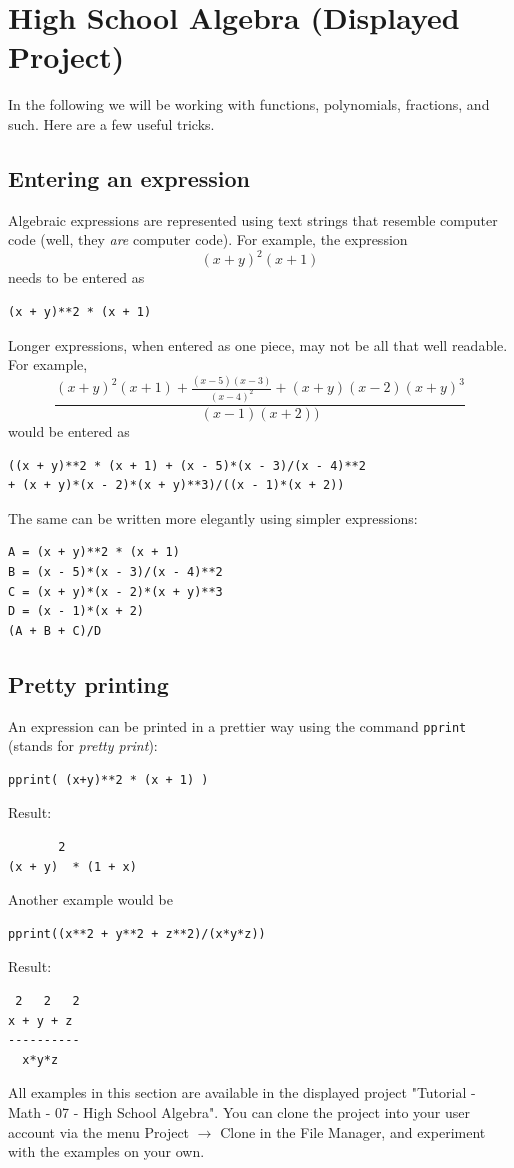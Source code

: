\documentclass[article,A4,12pt]{llncs}
\begin{document}

\section{High School Algebra (Displayed Project)}\label{algebra}

In the following we will be working with functions, polynomials, fractions, and such.
Here are a few useful tricks.

\subsection{Entering an expression}
Algebraic expressions are represented using text strings that resemble 
computer code (well, they {\em are} computer code). For example, the expression 
$$
  (x + y)^2 (x + 1)
$$ 
needs to be entered as
\begin{verbatim}
(x + y)**2 * (x + 1)
\end{verbatim}
Longer expressions, when entered as one piece, may not be all that well readable. For example,
$$
\frac{(x + y)^2 (x + 1) + \frac{(x-5)(x-3)}{(x-4)^2} + (x + y)(x - 2)(x + y)^3}{(x-1)(x+2))}
$$ 
would be entered as 
\begin{verbatim}
((x + y)**2 * (x + 1) + (x - 5)*(x - 3)/(x - 4)**2 
+ (x + y)*(x - 2)*(x + y)**3)/((x - 1)*(x + 2))
\end{verbatim}
The same can be written more elegantly using simpler expressions:
\begin{verbatim}
A = (x + y)**2 * (x + 1)
B = (x - 5)*(x - 3)/(x - 4)**2
C = (x + y)*(x - 2)*(x + y)**3
D = (x - 1)*(x + 2)
(A + B + C)/D
\end{verbatim}

\subsection{Pretty printing}
An expression can be printed in a prettier way using the command {\tt pprint} (stands for {\em pretty print}):
\begin{verbatim}
pprint( (x+y)**2 * (x + 1) )
\end{verbatim}
Result:
\begin{verbatim}
       2
(x + y)  * (1 + x)
\end{verbatim}
Another example would be
\begin{verbatim}
pprint((x**2 + y**2 + z**2)/(x*y*z))
\end{verbatim}
Result:
\begin{verbatim}
 2   2   2
x + y + z
----------
  x*y*z   
\end{verbatim}
All examples in this section are available in the displayed project 
"Tutorial - Math - 07 - High School Algebra". You can clone the project into 
your user account via the menu Project $\rightarrow$ Clone in the File 
Manager, and experiment with the examples on your own.
\end{document}
